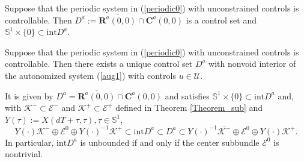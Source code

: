 \documentclass[10pt,a4paper]{amsart}
\begin{document}
\begin{lemma}
\label{Lemma_point}Suppose that the periodic system in (\ref{periodic0}) with
unconstrained controls is controllable. Then $D^{a}:=\overline{\mathbf{R}%
^{a}(0,0)}\cap\mathbf{C}^{a}(0,0)$ is a control set and $\mathbb{S}^{1}%
\times\{0\}\subset\mathrm{int}D^{a}$.
\end{lemma}

\begin{theorem}
\label{Theorem_cs1}Suppose that the periodic system in (\ref{periodic0}) with
unconstrained controls is controllable. Then there exists a unique control set
$D^{a}$ with nonvoid interior of the autonomized system (\ref{aug1}) with
controls $u\in\mathcal{U}$.

It is given by $D^{a}=\overline{\mathbf{R}^{a}(0,0)}\cap\mathbf{C}^{a}(0,0)$
and satisfies $\mathbb{S}^{1}\times\{0\}\subset\mathrm{int}D^{a}$ and, with
$\mathcal{K}^{-}\subset\mathcal{E}^{-}$ and $\mathcal{K}^{+}\subset
\mathcal{E}^{+}$ defined in Theorem \ref{Theorem_sub} and $Y(\tau
):=X(dT+\tau,\tau),\tau\in\mathbb{S}^{1}$,%
\begin{equation}
Y(\cdot)\mathcal{K}^{-}\oplus\mathcal{E}^{0}\oplus Y(\cdot)^{-1}%
\mathcal{K}^{+}\subset\mathrm{int}D^{a}\subset D^{a}\subset Y(\cdot
)^{-1}\overline{\mathcal{K}^{-}}\oplus\mathcal{E}^{0}\oplus Y(\cdot
)\mathcal{K}^{+}. \label{D_a2}%
\end{equation}
In particular, $\mathrm{int}D^{a}$ is unbounded if and only if the center
subbundle $\mathcal{E}^{0}$ is nontrivial.
\end{theorem}
\end{document}
